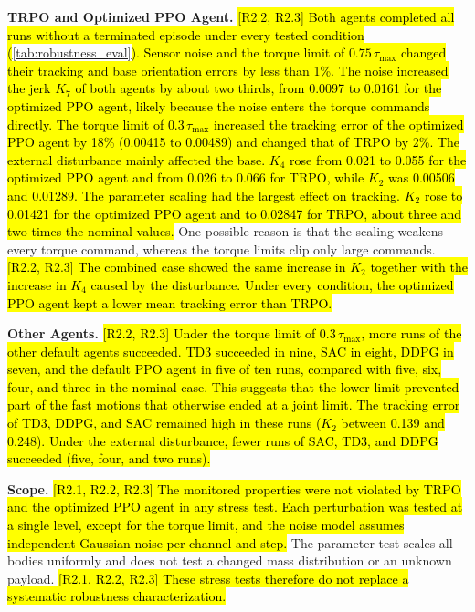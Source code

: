 \documentclass{ieeeaccess}
\newcommand{\hlone}[1]{{\sethlcolor{rone}\hl{#1}}}
\begin{document}
\textbf{TRPO and Optimized PPO Agent.} \hlone{[R2.2, R2.3] Both agents completed all runs without a terminated episode under
every tested condition (}\cref{tab:robustness_eval}\hlone{). Sensor noise and the torque limit of
$0.75\,\tau_{\max}$ changed their tracking and base orientation errors by less than 1\%. The noise increased
the jerk $K_7$ of both agents by about two thirds, from 0.0097 to 0.0161 for the optimized PPO agent,
likely because the noise enters the torque commands directly. The torque limit of $0.3\,\tau_{\max}$
increased the tracking error of the optimized PPO agent by 18\% (0.00415 to 0.00489) and changed that of
TRPO by 2\%. The external disturbance mainly affected the base. $K_4$ rose from 0.021 to 0.055 for the
optimized PPO agent and from 0.026 to 0.066 for TRPO, while $K_2$ was 0.00506 and 0.01289. The
parameter scaling had the largest effect on tracking. $K_2$ rose to 0.01421 for the optimized PPO agent
and to 0.02847 for TRPO, about three and two times the nominal values.} One possible reason
is that the scaling weakens every torque command, whereas the torque limits clip only large commands.
\hlone{[R2.2, R2.3] The combined case showed the same increase in $K_2$ together with the increase in
$K_4$ caused by the disturbance. Under every condition, the optimized PPO agent kept a lower mean
tracking error than TRPO.}

\textbf{Other Agents.} \hlone{[R2.2, R2.3] Under the torque limit of $0.3\,\tau_{\max}$, more runs of the other default agents
succeeded. TD3 succeeded in nine, SAC in eight, DDPG in seven, and the default PPO agent in five of ten
runs, compared with five, six, four, and three in the nominal case. This suggests that the lower limit
prevented part of the fast motions that otherwise ended at a joint limit. The tracking error of TD3, DDPG,
and SAC remained high in these runs ($K_2$ between 0.139 and 0.248). Under the external disturbance, fewer
runs of SAC, TD3, and DDPG succeeded (five, four, and two runs).}

\textbf{Scope.} \hlone{[R2.1, R2.2, R2.3] The monitored properties were not violated by TRPO and the optimized PPO agent in any
stress test. Each perturbation was tested at a single level, except for the torque limit, and the noise
model assumes independent Gaussian noise per channel and step.} The parameter test scales
all bodies uniformly and does not test a changed mass distribution or an unknown payload.
\hlone{[R2.1, R2.2, R2.3] These stress tests therefore do not replace a systematic robustness
characterization.}
\end{document}
